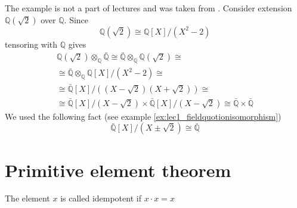 \begin{example}
  The example is not a part of lectures and was taken from
  \cite{bib:KeithConradSeparability2}.
  Consider extension $\mathbb{Q}\left(\sqrt{2}\right)$ over
  $\mathbb{Q}$. Since
  \[
  \mathbb{Q}\left(\sqrt{2}\right) \cong
  \mathbb{Q}\left[X\right]/\left(X^2 - 2\right)
  \]
  tensoring with $\mathbb{Q}$ gives
  \begin{eqnarray}
    \mathbb{Q}\left(\sqrt{2}\right) \otimes_{\mathbb{Q}}
    \bar{\mathbb{Q}} \cong
    \bar{\mathbb{Q}} \otimes_{\mathbb{Q}}
    \mathbb{Q}\left(\sqrt{2}\right)
    \cong
    \nonumber \\
    \cong
    \bar{\mathbb{Q}} \otimes_{\mathbb{Q}}
    \mathbb{Q}\left[X\right]/\left(X^2 - 2\right)
    \cong
    \nonumber \\
    \cong
    \bar{\mathbb{Q}}\left[X\right]/
    \left(
    \left(X - \sqrt{2}\right)
    \left(X + \sqrt{2}\right)
    \right)
    \cong
    \nonumber \\
    \cong
    \bar{\mathbb{Q}}\left[X\right]/\left(X - \sqrt{2}\right)
    \times
    \bar{\mathbb{Q}}\left[X\right]/\left(X - \sqrt{2}\right)
    \cong
    \bar{\mathbb{Q}} \times \bar{\mathbb{Q}}
    \nonumber
  \end{eqnarray}
  We used the following fact (see example
  \ref{ex:lec1_fieldquotionisomorphism}) 
  \[
  \bar{\mathbb{Q}}\left[X\right]/\left(X \pm \sqrt{2}\right)
  \cong
  \bar{\mathbb{Q}}
  \]  
  \label{ex:lec5_conrad}
\end{example}

\section{Primitive element theorem}

\begin{definition}[Idempotent]
  The element $x$ is called idempotent if $x \cdot x = x$
  \label{def:idempotent}
\end{definition}

